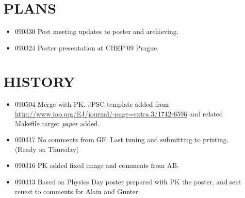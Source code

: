 \begin{appendix}
\section{PLANS}
\begin{itemize}
\item 090330 Post meeting updates to poster and archieving.
\item 090324 Poster presentation at CHEP'09 Prague.
\end{itemize}

\section{HISTORY}
\begin{itemize}
\item 090504 Merge with PK. JPSC template added from \url{http://www.iop.org/EJ/journal/-page=extra.3/1742-6596} and
related Makefile target {\em paper} added.
\item 090317 No comments from GF. Last tuning and submitting to printing. (Ready on Thursday)
\item 090316  PK added  fixed image and comments from AB. 
\item 090313 Based on Physics Day poster prepared with PK the poster, 
             and sent reuest to comments for Alain and Gunter.
\end{itemize}
\end{appendix}
